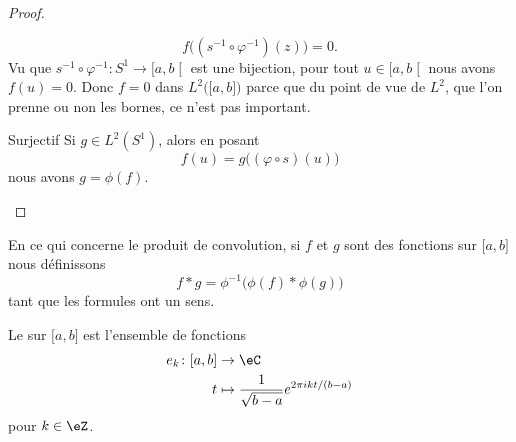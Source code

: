 \begin{proof}
\begin{subproof}
            \begin{equation}
                f\big( (s^{-1}\circ\varphi^{-1})(z) \big)=0.
            \end{equation}
            Vu que \( s^{-1}\circ\varphi^{-1}\colon S^1 \to \mathopen[ a , b \mathclose[\) est une bijection, pour tout \( u\in\mathopen[ a , b \mathclose[\) nous avons \( f(u)=0\). Donc \( f=0\) dans \( L^2\big( \mathopen[ a , b \mathclose] \big)\) parce que du point de vue de \( L^2\), que l'on prenne ou non les bornes, ce n'est pas important.
        \item[Surjectif]
            Si \( g\in L^2(S^1)\), alors en posant
            \begin{equation}
                f(u)=g\big( (\varphi\circ s)(u) \big)
            \end{equation}
            nous avons \( g=\phi(f)\).
    \end{subproof}
\end{proof}

\begin{definition}
    En ce qui concerne le produit de convolution, si \( f\) et \( g\) sont des fonctions sur \( \mathopen[ a , b \mathclose]\) nous définissons
    \begin{equation}
        f*g=\phi^{-1}\big( \phi(f)*\phi(g) \big)
    \end{equation}
    tant que les formules ont un sens.
\end{definition}

\begin{definition}
    Le  sur \( \mathopen[ a , b \mathclose]\) est l'ensemble de fonctions
    \begin{equation}
        \begin{aligned}
            e_k\colon \mathopen[ a , b \mathclose]&\to \eC \\
            t&\mapsto  \frac{1}{ \sqrt{ b-a } } e^{2\pi i kt/(b-a)} 
        \end{aligned}
    \end{equation}
    pour \( k\in \eZ\).
\end{definition}

